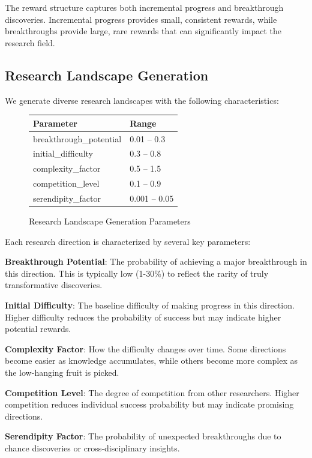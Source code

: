 \documentclass[letterpaper]{article} %
\begin{document}
The reward structure captures both incremental progress and breakthrough discoveries. Incremental progress provides small, consistent rewards, while breakthroughs provide large, rare rewards that can significantly impact the research field.

\subsection{Research Landscape Generation}

We generate diverse research landscapes with the following characteristics:

\begin{figure}[h]
\centering
\begin{tabular}{ll}
\hline
\textbf{Parameter} & \textbf{Range} \\
\hline
breakthrough\_potential & 0.01 -- 0.3 \\
initial\_difficulty & 0.3 -- 0.8 \\
complexity\_factor & 0.5 -- 1.5 \\
competition\_level & 0.1 -- 0.9 \\
serendipity\_factor & 0.001 -- 0.05 \\
\hline
\end{tabular}
\caption{Research Landscape Generation Parameters}
\end{figure}

Each research direction is characterized by several key parameters:

\textbf{Breakthrough Potential}: The probability of achieving a major breakthrough in this direction. This is typically low (1-30\%) to reflect the rarity of truly transformative discoveries.

\textbf{Initial Difficulty}: The baseline difficulty of making progress in this direction. Higher difficulty reduces the probability of success but may indicate higher potential rewards.

\textbf{Complexity Factor}: How the difficulty changes over time. Some directions become easier as knowledge accumulates, while others become more complex as the low-hanging fruit is picked.

\textbf{Competition Level}: The degree of competition from other researchers. Higher competition reduces individual success probability but may indicate promising directions.

\textbf{Serendipity Factor}: The probability of unexpected breakthroughs due to chance discoveries or cross-disciplinary insights.
\end{document}
